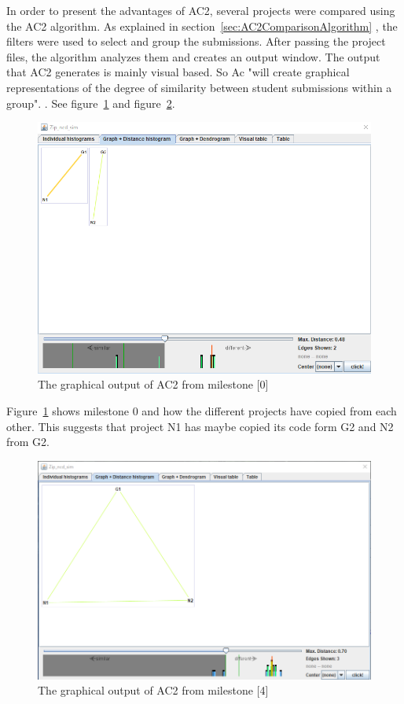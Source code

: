 \documentclass[a4paper, 11pt]{article}
\renewcommand{\\}{\vspace*{0.5\baselineskip} \newline}
\begin{document}
In order to present the advantages of AC2, several projects were compared using the AC2 algorithm. As explained in section~\ref{sec:AC2ComparisonAlgorithm} , the filters were used to select and group the submissions. After passing the project files, the algorithm analyzes them and creates an output window. The output that AC2 generates is mainly visual based. So Ac "will create graphical representations of the degree of similarity between student submissions within a group". \autocite{AC2}. See figure~\ref{fig:AC2R1} and figure~\ref{fig:AC2R2}.

\begin{figure}[h]
	\includegraphics[scale=0.4]{figs/AC2/M0_1.png}
	\caption{The graphical output of AC2 from milestone [0]}
	\label{fig:AC2R1}
\end{figure}

Figure~\ref{fig:AC2R1} shows milestone 0 and how the different projects have copied from each other. This suggests that project N1 has maybe copied its code form G2 and N2 from G2.

\begin{figure}[h]
	\includegraphics[scale=0.4]{figs/AC2/M4_1.png}
	\caption{The graphical output of AC2 from milestone [4]}
	\label{fig:AC2R2}
\end{figure}
\end{document}
